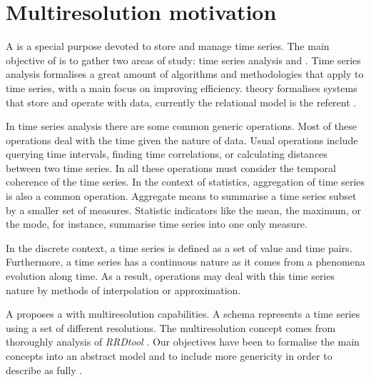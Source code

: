 \section{Multiresolution motivation}
\label{sec:features}

A  is a special purpose  devoted to store and
manage time series.  The main objective of  is to gather
two areas of study: time series analysis and .  Time series
analysis formalises a great amount of algorithms and methodologies
that apply to time series, with a main focus on improving
efficiency.  theory formalises systems that store and
operate with data, currently the relational model is the referent
\cite{date:introduction}.



In time series analysis there are some common generic operations.
Most of these operations deal with the time given the nature of data.
Usual operations include querying time intervals, finding time
correlations, or calculating distances between two time series. In
all these operations  must consider the temporal coherence
of the time series.  In the context of statistics, aggregation of time
series is also a common operation. Aggregate means to summarise a time
series subset by a smaller set of measures. Statistic indicators like
the mean, the maximum, or the mode, for instance, summarise time
series into one only measure.

In the discrete context, a time series is defined as a set of value
and time pairs. Furthermore, a time series has a continuous nature as
it comes from a phenomena evolution along time. As a result,
 operations may deal with this time series nature by
methods of interpolation or approximation.


A  proposes a  with multiresolution
capabilities.  A  schema represents a time series using a
set of different resolutions.  The multiresolution concept comes from
thoroughly analysis of \emph{RRDtool} \cite{rrdtool}. Our objectives
have been to formalise the main concepts into an abstract model and to
include more genericity in order to describe  as fully
.




